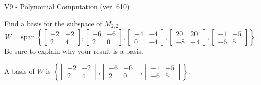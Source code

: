 \begin{exercise}
  \begin{exerciseTitle}V9 - Polynomial Computation (ver. 610)\end{exerciseTitle}
  \begin{exerciseStatement}
    Find a basis for the subspace of \(M_{2,2}\) 
\[W=\mathrm{span}\ \left\{\left[\begin{array}{cc}
-2 & -2 \\
2 & 4
\end{array}\right] , \left[\begin{array}{cc}
-6 & -6 \\
2 & 0
\end{array}\right] , \left[\begin{array}{cc}
-4 & -4 \\
0 & -4
\end{array}\right] , \left[\begin{array}{cc}
20 & 20 \\
-8 & -4
\end{array}\right] , \left[\begin{array}{cc}
-1 & -5 \\
-6 & 5
\end{array}\right]\right\}.\]
 Be sure to explain why your result is a basis.


  \end{exerciseStatement}
  \begin{exerciseAnswer}
   A basis of \(W\) is  \(\left\{\left[\begin{array}{cc}
-2 & -2 \\
2 & 4
\end{array}\right] , \left[\begin{array}{cc}
-6 & -6 \\
2 & 0
\end{array}\right] , \left[\begin{array}{cc}
-1 & -5 \\
-6 & 5
\end{array}\right]\right\}\).
  


  \end{exerciseAnswer}
\end{exercise}